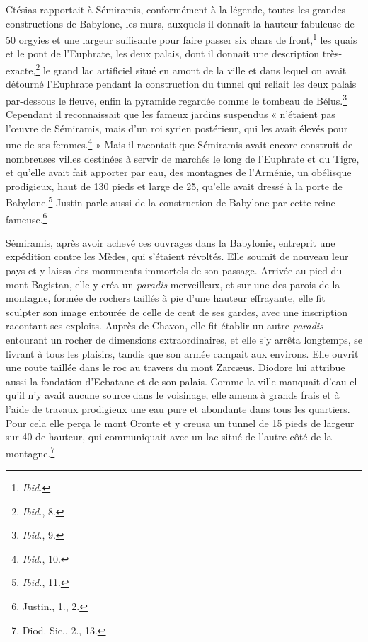 \documentclass[a4paper, 11pt, oneside]{article}
\begin{document}
Ctésias rapportait à Sémiramis, conformément à la légende, toutes les grandes constructions de Babylone, les murs, auxquels il donnait la hauteur fabuleuse de 50 orgyies et une largeur suffisante pour faire passer six chars de front,\footnote{\emph{Ibid.}} les quais et le pont de l'Euphrate, les deux palais, dont il donnait une description très-exacte,\footnote{\emph{Ibid.}, 8.} le grand lac artificiel situé en amont de la ville et dans lequel on avait détourné l'Euphrate pendant la construction du tunnel qui reliait les deux palais par-dessous le fleuve, enfin la pyramide regardée comme le tombeau de Bélus.\footnote{\emph{Ibid.}, 9.} Cependant il reconnaissait que les fameux jardins suspendus « n'étaient pas l'œuvre de Sémiramis, mais d'un roi syrien postérieur, qui les avait élevés pour une de ses femmes.\footnote{\emph{Ibid.}, 10.} » Mais il racontait que Sémiramis avait encore construit de nombreuses villes destinées à servir de marchés le long de l'Euphrate et du Tigre, et qu'elle avait fait apporter par eau, des montagnes de l'Arménie, un obélisque prodigieux, haut de 130 pieds et large de 25, qu'elle avait dressé à la porte de Babylone.\footnote{\emph{Ibid.}, 11.} Justin parle aussi de la construction de Babylone par cette reine fameuse.\footnote{Justin., 1., 2.}

Sémiramis, après avoir achevé ces ouvrages dans la Babylonie, entreprit une expédition contre les Mèdes, qui s'étaient révoltés. Elle soumit de nouveau leur pays et y laissa des monuments immortels de son passage. Arrivée au pied du mont Bagistan, elle y créa un \emph{paradis} merveilleux, et sur une des parois de la montagne, formée de rochers taillés à pie d'une hauteur effrayante, elle fit sculpter son image entourée de celle de cent de ses gardes, avec une inscription racontant ses exploits. Auprès de Chavon, elle fit établir un autre \emph{paradis} entourant un rocher de dimensions extraordinaires, et elle s'y arrêta longtemps, se livrant à tous les plaisirs, tandis que son armée campait aux environs. Elle ouvrit une route taillée dans le roc au travers du mont Zarcæus. Diodore lui attribue aussi la fondation d'Ecbatane et de son palais. Comme la ville manquait d'eau el qu'il n'y avait aucune source dans le voisinage, elle amena à grands frais et à l'aide de travaux prodigieux une eau pure et abondante dans tous les quartiers. Pour cela elle perça le mont Oronte et y creusa un tunnel de 15 pieds de largeur sur 40 de hauteur, qui communiquait avec un lac situé de l'autre côté de la montagne.\footnote{Diod. Sic., 2., 13.}
\end{document}
